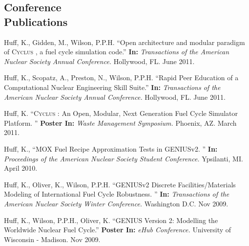 \documentclass[margin,line]{resume}
\newcommand{\Cyclus}{\textsc{Cyclus }}
\begin{document}
\begin{resume}
    \section{\mysidestyle Conference\\Publications}
    \begin{bibenum}
      \item Huff, K., Gidden, M., Wilson, P.P.H. ``Open architecture and modular paradigm of \Cyclus, a fuel cycle simulation code.''
        \textbf{In: } \emph{Transactions of the American Nuclear Society Annual Conference.} 
        Hollywood, FL. June 2011.
      \item Huff, K., Scopatz, A., Preston, N., Wilson, P.P.H. ``Rapid Peer Education of a Computational Nuclear Engineering Skill Suite.'' 
        \textbf{In: } \emph{Transactions of the American Nuclear Society Annual Conference.} 
        Hollywood, FL. June 2011.
      \item Huff, K. ``\Cyclus: An Open, Modular, Next Generation Fuel Cycle Simulator Platform. ''
        \textbf{Poster In: } \emph{Waste Management Symposium.} Phoenix, AZ. March 
        2011.
      \item Huff, K., ``MOX Fuel Recipe Approximation Tests in GENIUSv2. ''
        \textbf{In: } \emph{Proceedings of the American Nuclear Society Student Conference.} 
        Ypsilanti, MI. April 2010.
      \item Huff, K., Oliver, K., Wilson, P.P.H. ``GENIUSv2 Discrete Facilities/Materials Modeling of International 
        Fuel Cycle Robustness. ''
        \textbf{In: } \emph{Transactions of the American Nuclear Society Winter Conference.} 
        Washington D.C. Nov 2009. 
      \item Huff, K., Wilson, P.P.H., Oliver, K. ``GENIUS Version 2: Modelling the Worldwide Nuclear Fuel Cycle.'' 
        \textbf{Poster In: } \emph{eHub Conference.} University of Wisconsin - Madison. Nov 2009.
    \end{bibenum}


\end{resume}
\end{document}
